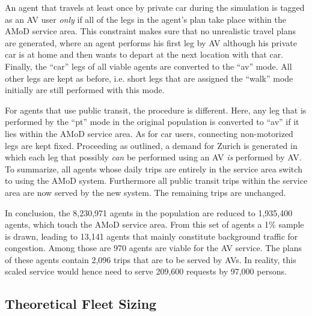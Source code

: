 
An agent that travels at least once by private car during the simulation is tagged
as an AV user \textit{only} if all of the legs in the agent's plan take place
within the AMoD service area. This constraint makes sure that no unrealistic travel
plans are generated, where an agent performs his first leg by AV although his
private car is at home and then wants to depart at the next location with that
car. Finally, the ``car'' legs of all viable agents are converted to the ``av'' mode.
All other legs are kept as before, i.e. short legs that are assigned the ``walk''
mode initially are still performed with this mode. 

For agents that use public transit, the procedure is different. Here, any leg
that is performed by the ``pt'' mode in the original population is converted to ``av''
if it lies within the AMoD service area. As for car users, connecting non-motorized
legs are kept fixed. Proceeding as outlined, a demand for Zurich is generated in which each leg that possibly
\textit{can} be performed using an AV \textit{is} performed by AV. To summarize, all agents whose daily trips are entirely in the service area switch to using the AMoD system. Furthermore all public transit trips within the service area are now served by the new system. The remaining trips are unchanged.

In conclusion, the 8,230,971 agents in the population are reduced to
1,935,400 agents, which touch the AMoD service area. From this set of agents
a 1\% sample  is drawn, leading to 13,141 agents that mainly constitute
background traffic for congestion. Among those are 970 agents are viable for the AV
service. The plans of these agents contain 2,096 trips that are to be served by
AVs. In reality, this scaled service would hence need to serve 209,600 requests by
97,000 persons. 

\subsection{Theoretical Fleet Sizing}


